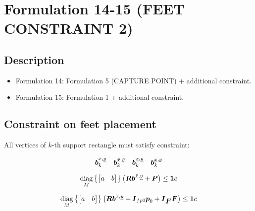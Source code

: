 \section{Formulation 14-15 (FEET CONSTRAINT 2)}


\subsection{Description}
\begin{itemize}
    \item Formulation 14: Formulation 5 (CAPTURE POINT) + additional constraint.
    \item Formulation 15: Formulation 1 + additional constraint.
\end{itemize}



\subsection{Constraint on feet placement}
All vertices of $k$-th support rectangle must satisfy constraint:

\begin{equation*}
    \mbox{\boldmath $b$}^{\bar{x},\underline{y}}_k
    \quad
    \mbox{\boldmath $b$}^{\bar{x},\bar{y}}_k
    \quad
    \mbox{\boldmath $b$}^{\underline{x},\underline{y}}_k
    \quad
    \mbox{\boldmath $b$}^{\underline{x},\bar{y}}_k
\end{equation*}

\begin{equation*}
    \underset{M}{\operatorname{diag}}\left\{\begin{bmatrix} a & b \end{bmatrix}\right\}
    \left(
        \mbox{\boldmath $R$}
        \mbox{\boldmath $b$}^{\bar{x},\underline{y}}
        +
        \mbox{\boldmath $P$}
    \right)
    \le
    \mbox{\boldmath $1$} c
\end{equation*}


\begin{equation*}
    \underset{M}{\operatorname{diag}}\left\{\begin{bmatrix} a & b \end{bmatrix}\right\}
    \left(
        \mbox{\boldmath $R$}
        \mbox{\boldmath $b$}^{\bar{x},\underline{y}}
        +
        \mbox{\boldmath $I$}_{fp0}
        \mbox{\boldmath $p$}_0
        +
        \mbox{\boldmath $I$}_{\mbox{\boldmath $F$}}
        \mbox{\boldmath $F$}
    \right)
    \le
    \mbox{\boldmath $1$} c
\end{equation*}


